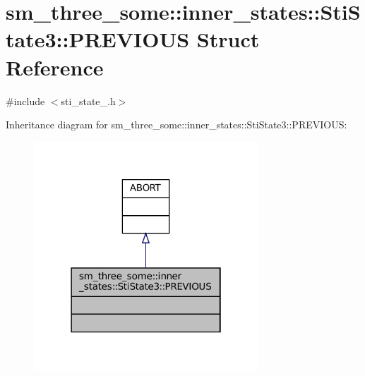 \hypertarget{structsm__three__some_1_1inner__states_1_1StiState3_1_1PREVIOUS}{}\section{sm\+\_\+three\+\_\+some\+:\+:inner\+\_\+states\+:\+:Sti\+State3\+:\+:P\+R\+E\+V\+I\+O\+US Struct Reference}
\label{structsm__three__some_1_1inner__states_1_1StiState3_1_1PREVIOUS}


{\ttfamily \#include $<$sti\+\_\+state\+\_.\+h$>$}



Inheritance diagram for sm\+\_\+three\+\_\+some\+:\+:inner\+\_\+states\+:\+:Sti\+State3\+:\+:P\+R\+E\+V\+I\+O\+US\+:
\nopagebreak
\begin{figure}[H]
\begin{center}
\leavevmode
\includegraphics[width=238pt]{structsm__three__some_1_1inner__states_1_1StiState3_1_1PREVIOUS__inherit__graph}
\end{center}
\end{figure}


